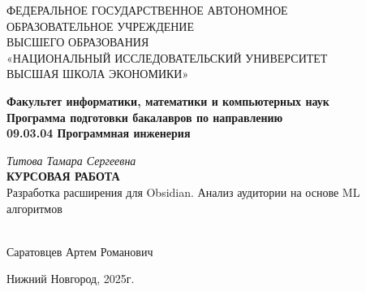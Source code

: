 \documentclass[14pt]{extarticle}
\begin{document}
\begin{titlepage}

\begin{center}

\normalsize

\normalsize{ФЕДЕРАЛЬНОЕ ГОСУДАРСТВЕННОЕ АВТОНОМНОЕ\\ОБРАЗОВАТЕЛЬНОЕ УЧРЕЖДЕНИЕ\\ВЫСШЕГО ОБРАЗОВАНИЯ\\«НАЦИОНАЛЬНЫЙ ИССЛЕДОВАТЕЛЬСКИЙ УНИВЕРСИТЕТ\\

ВЫСШАЯ ШКОЛА ЭКОНОМИКИ»}

\vfill

\textbf{Факультет информатики, математики и компьютерных наук}\\[3mm]

\textbf{Программа подготовки бакалавров по направлению\\09.03.04 Программная инженерия}

\vfill

\textit{Титова Тамара Сергеевна}\\[3mm]

\textbf{КУРСОВАЯ РАБОТА}\\[10mm]

\normalsize{Разработка расширения для Obsidian. Анализ аудитории на основе ML алгоритмов}

\end{center}

\vfill
\newlength{\ML}
\hfill
\begin{minipage}{0.4\textwidth}
\\[2mm]
Саратовцев Артем Романович
\end{minipage}%
\vfill
\begin{center}

Нижний Новгород, 2025г.

\end{center}

\end{titlepage}

\renewcommand{\contentsname}{Оглавление} 
\tableofcontents                          
{} 
\thispagestyle{empty}                    
\end{document}

